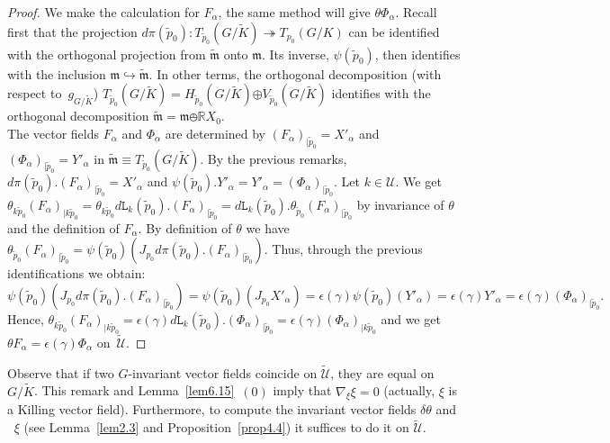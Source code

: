 \documentclass[a4paper,reqno]{amsart}
\theoremstyle{definition}
\theoremstyle{remark}
\theoremstyle{plain}
\numberwithin{equation}{section}
\newcommand{\R}{{\mathbb{R}}}
\newcommand{\fm}{{\mathfrak{m}}}
\newcommand{\sto}{\twoheadrightarrow}
\newcommand{\ito}{\hookrightarrow}
\def\boplus{\mathbin{\boldsymbol{\oplus}}}
\DeclareMathOperator{\rough}{{\nabla^*\nabla}}
\newcommand{\Mt}{{\widetilde{M}}}
\newcommand{\Kt}{{\widetilde{K}}}
\newcommand{\wK}{{\widetilde{K}}}
\newcommand{\Ut}{{\widetilde{\mathcal{U}}}}
\newcommand{\wm}{{\widetilde{\mathfrak{m}}}}
\newcommand{\wpzero}{{\tilde{p}_0}}
\newcommand{\pzero}{{p_0}}
\newcommand{\ltr}{\mathtt{L}}
\begin{document}
\begin{proof}
  We make the calculation for $F_\alpha$, the same method will
  give $\theta \Phi_\alpha$.  Recall first that the projection
  $d\pi(\wpzero) : T_\wpzero (G/\Kt) \sto T_\pzero (G/K)$ can be
  identified with the orthogonal projection from $\wm$ onto
  $\fm$. Its inverse, $\psi(\wpzero)$, then identifies with the
  inclusion $\fm \ito \wm$. In other terms, the orthogonal
  decomposition (with respect to~$g_{\scriptscriptstyle{G/\wK}}$)
  $T_\wpzero (G/\Kt)  = H_\wpzero(G/\Kt) \boplus V_\wpzero (G/\Kt)$ identifies
  with the orthogonal decomposition $\wm = \fm \obot \R X_0$.
  \\
  The vector fields $F_\alpha$ and $\Phi_\alpha$ are determined
  by $(F_\alpha)_{\mid \wpzero} = X'_\alpha$ and
  $(\Phi_\alpha)_{\mid \wpzero} = Y'_\alpha$ in
  $\wm \equiv T_\wpzero (G/\Kt)$.  By the previous remarks,
  $d\pi(\wpzero).(F_\alpha)_{\mid \wpzero} = X'_\alpha$ and
  $\psi(\wpzero).Y'_\alpha = Y'_\alpha= (\Phi_\alpha)_{\mid
    \wpzero}$.  Let $k\in \mathcal{U}$. We get   $\theta_{k\wpzero} (F_\alpha)_{\mid k\wpzero} =
  \theta_{k\wpzero} d\ltr_k(\wpzero).(F_\alpha)_{\mid \wpzero} =
  d\ltr_k(\wpzero). \theta_{\wpzero}(F_\alpha)_{\mid \wpzero}$ by invariance of $\theta$
  and the definition of $F_\alpha$. 
  By   definition of $\theta$  we have 
$\theta_{\wpzero}(F_\alpha)_{\mid \wpzero} =
\psi(\wpzero)(J_{p_0} d\pi(\wpzero).(F_\alpha)_{\mid
  \wpzero})$.
Thus, through the previous identifications we obtain:
\begin{equation*}
\psi(\wpzero)(J_{p_0} d\pi(\wpzero).(F_\alpha)_{\mid
  \wpzero})  = \psi(\wpzero) (J_\pzero X'_\alpha)  = \epsilon(\gamma)
\psi(\wpzero)(Y'_\alpha) = \epsilon(\gamma) Y'_\alpha=
\epsilon(\gamma) (\Phi_\alpha)_{\mid
  \wpzero}. %
\end{equation*}
Hence,
$\theta_{k\wpzero} (F_\alpha)_{\mid k\wpzero} =  \epsilon(\gamma)
d\ltr_k(\wpzero).(\Phi_\alpha)_{\mid
  \wpzero} = \epsilon(\gamma) (\Phi_\alpha)_{\mid k\wpzero}$ and
we get $\theta F_\alpha
= \epsilon(\gamma) \Phi_\alpha$ on~$\Ut$.
\end{proof}


Observe that if two $G$-invariant vector fields coincide on
$\Ut$, they are equal on~$G/\Kt$. This remark and
Lemma~\ref{lem6.15}~$(0)$ imply that $\nabla_\xi\xi = 0$
(actually, $\xi$ is a Killing vector field). Furthermore, to
compute the invariant vector fields $\delta \theta$ and
$\rough \xi$ (see Lemma~\ref{lem2.3} and
Proposition~\ref{prop4.4}) it suffices to do it on $\Ut$.
 
\end{document}
